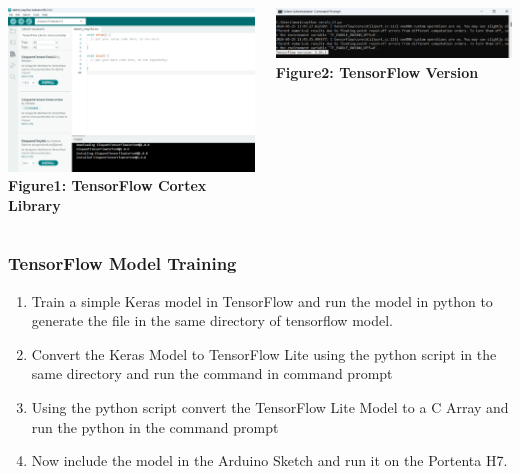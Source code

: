 {
	\begin{columns}
		\centering
		\includegraphics[width=\textwidth]{images/TensorFlowCortexLibrary}
		\vspace{0.2cm}
		\textbf{Figure1: TensorFlow Cortex Library}
		
		\centering
		\includegraphics[width=\textwidth]{images/TensorFlowVersion}
		\vspace{0.2cm}
		\textbf{Figure2: TensorFlow Version} 
		
	\end{columns}
	
}

\begin{frame}[fragile]
	\frametitle{TensorFlow Model Training}
	
	
\end{frame}

{
	\begin{enumerate}
		\item Train a simple Keras model in TensorFlow and run the model in python to generate the file  in the same directory of tensorflow model.
		
		\item Convert the Keras Model to TensorFlow Lite using the python script in the same directory and run the command  in command prompt
		
		\item Using the python script convert the TensorFlow Lite Model to a C Array and run the python  in the command prompt
		
		\item Now include the model in the Arduino Sketch and run it on the Portenta H7.
	\end{enumerate}
}

